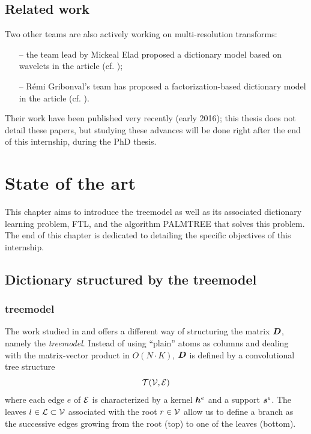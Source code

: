 \section{Related work}
Two other teams are also actively working on multi-resolution transforms:
\begin{itemize}
	\item[--] the team lead by Mickeal Elad proposed a dictionary model based on wavelets in the article  (cf. \cite{sulam_trainlets:_2016});
	\item[--] Rémi Gribonval’s team has proposed a factorization-based dictionary model in the article  (cf. \cite{magoarou_flexible_2016}).
\end{itemize}
Their work have been published very recently (early 2016); this thesis does not detail these papers, but studying these advances will be done right after the end of this internship, during the PhD thesis.

\chapter{State of the art}
This chapter aims to introduce the \Gls{treemodel} as well as its associated dictionary learning problem, \acs{FTL}, and the algorithm \ac{PALMTREE} that solves this problem. The end of this chapter is dedicated to detailing the specific objectives of this internship.

\section{Dictionary structured by the \Gls{treemodel}}

\subsection{\Gls{treemodel}}\label{sec_tree_model}
The work studied in \cite{chabiron_toward_2015} and \cite{chabiron_optimization_2016} offers a different way of structuring the matrix $\bm{D}$, namely the \emph{\Gls{treemodel}}. Instead of using “plain” atoms as columns and dealing with the matrix-vector product in $O(N \cdot K)$, $\bm{D}$ is defined by a convolutional tree structure $$\mathcal T(\mathcal V,\mathcal E)$$ where each edge $e$ of $\mathcal E$ is characterized by a kernel $\bm{h}^e$ and a support $\bm{s}^e$. The leaves $l \in \mathcal L \subset \mathcal V$ associated with the root $r \in \mathcal V$ allow us to define a branch as the successive edges growing from the root (top) to one of the leaves (bottom).

